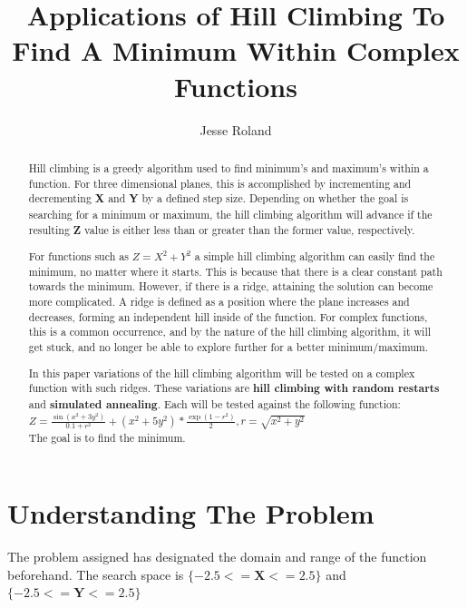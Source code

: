 \documentclass[]{report}
\title{Applications of Hill Climbing To Find A Minimum Within Complex Functions}
\author{Jesse Roland}
\begin{document}
\maketitle

\begin{abstract}
	\fontsize{14}{16}\selectfont
	Hill climbing is a greedy algorithm used to find minimum's and maximum's within a function. For three dimensional planes, this is accomplished by incrementing and decrementing \textbf{X} and \textbf{Y} by a defined step size. Depending on whether the goal is searching for a minimum or maximum, the hill climbing algorithm will advance if the resulting \textbf{Z} value is either less than or greater than the former value, respectively.
	
	For functions such as \begin{math}
	Z = X^2 + Y^2
	\end{math} a simple hill climbing algorithm can easily find the minimum, no matter where it starts. This is because that there is a clear constant path towards the minimum. However, if there is a ridge, attaining the solution can become more complicated. A ridge is defined as a position where the plane increases and decreases, forming an independent hill inside of the function. For complex functions, this is a common occurrence, and by the nature of the hill climbing algorithm, it will get stuck, and no longer be able to explore further for a better minimum/maximum.
	
	In this paper variations of the hill climbing algorithm will be tested on a complex function with such ridges. These variations are \textbf{hill climbing with random restarts} and \textbf{simulated annealing}. Each will be tested against the following function:\\
	\begin{math}
	Z=\frac{\sin{(x^2+3y^2)}}{0.1+r^2}+(x^2+5y^2)*\frac{\exp{(1-r^2)}}{2},r=\sqrt{x^2+y^2}
	\end{math}\\The goal is to find the minimum.
	
\end{abstract}

\chapter{Understanding The Problem}
	
	The problem assigned has designated the domain and range of the function beforehand. The search space is \begin{math}
		{\{-2.5 <= \textbf{X} <= 2.5\}} 
	\end{math} and \begin{math}
		{\{-2.5 <= \textbf{Y} <= 2.5\}} 
	\end{math} 
	
\end{document}

